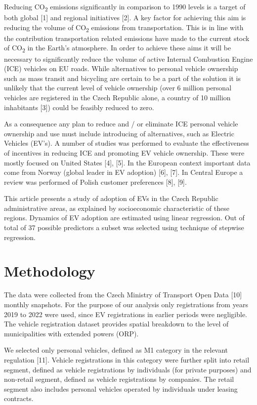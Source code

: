 \documentclass{mmeproc}
\begin{document}
Reducing CO\textsubscript{2} emissions significantly in comparison to
1990 levels is a target of both global {[}1{]} and regional initiatives
{[}2{]}. A key factor for achieving this aim is reducing the volume of
CO\textsubscript{2} emissions from transportation. This is in line with
the contribution transportation related emissions have made to the
current stock of CO\textsubscript{2} in the Earth's atmosphere. In order
to achieve these aims it will be necessary to significantly reduce the
volume of active Internal Combustion Engine (ICE) vehicles on EU roads.
While alternatives to personal vehicle ownership such as mass transit
and bicycling are certain to be a part of the solution it is unlikely
that the current level of vehicle ownership (over 6 million personal
vehicles are registered in the Czech Republic alone, a country of 10
million inhabitants {[}3{]}) could be feasibly reduced to zero.

As a consequence any plan to reduce and / or eliminate ICE personal
vehicle ownership and use must include introducing of alternatives, such
as Electric Vehicles (EV's). A number of studies was performed to
evaluate the effectiveness of incentives in reducing ICE and promoting
EV vehicle ownership. These were mostly focused on United States
{[}4{]}, {[}5{]}. In the European context important data come from
Norway (global leader in EV adoption) {[}6{]}, {[}7{]}. In Central
Europe a review was performed of Polish customer preferences {[}8{]},
{[}9{]}.

This article presents a study of adoption of EVs in the Czech Republic
administrative areas, as explained by socioeconomic characteristic of
these regions. Dynamics of EV adoption are estimated using linear
regression. Out of total of 37 possible predictors a subset was selected
using technique of stepwise regression.

\hypertarget{methodology}{%
\section{Methodology}\label{methodology}}

The data were collected from the Czech Ministry of Transport Open Data
{[}10{]} monthly snapshots. For the purpose of our analysis only
registrations from years 2019 to 2022 were used, since EV registrations
in earlier periods were negligible. The vehicle registration dataset
provides spatial breakdown to the level of municipalities with extended
powers (ORP).

We selected only personal vehicles, defined as M1 category in the
relevant regulation {[}11{]}. Vehicle registrations in this category
were further split into retail segment, defined as vehicle registrations
by individuals (for private purposes) and non-retail segment, defined as
vehicle registrations by companies. The retail segment also includes
personal vehicles operated by individuals under leasing contracts.
\end{document}
